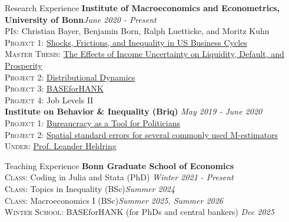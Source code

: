 \documentclass{resume}[10pt] %
\begin{document}
\begin{rSection}{Research Experience}
{\bf Institute of Macroeconomics and Econometrics, University of Bonn}\hfill {\em June 2020 - Present}\\
\textsc{PIs}: Christian Bayer, Benjamin Born, Ralph Luetticke, and Moritz Kuhn\\
\textsc{Project 1}: \href{https://www.ralphluetticke.com/files/BBL_Inequality_Sep2022.pdf}{Shocks, Frictions, and Inequality in US Business Cycles} \\
\textsc{Master Thesis}: \href{https://github.com/LuisCald/Master-Thesis/blob/main/master_thesis.pdf}{The Effects of Income Uncertainty on Liquidity, Default, and Prosperity} \\
\textsc{Project 2}: \href{https://github.com/LuisCald/DistributionalDynamics}{Distributional Dynamics} \\
\textsc{Project 3}: \href{https://github.com/BASEforHANK}{BASEforHANK} \\
\textsc{Project 4}: Job Levels II \\



{\bf Institute on Behavior \& Inequality (Briq)} \hfill {\em May 2019 - June 2020}\\
\textsc{Project 1}: \href{https://drive.google.com/file/d/1sQmazQaMzSg6RY7dHfJwmApYOkhFqtrp/view}{Bureaucracy as a Tool for Politicians}\\
\textsc{Project 2}: \href{https://drive.google.com/file/d/1TzPZ8FT4NvlW-lxk3L13H4BTwC0Jkd4U/view?usp=sharing}{Spatial standard errors for several commonly used M-estimators}\\
\textsc{Under}: \href{http://www.leanderheldring.com/}{Prof. Leander Heldring}
\end{rSection}

\footnotesize
\begin{rSection}{Teaching Experience}
{\bf Bonn Graduate School of Economics}\\
\textsc{Class}: Coding in Julia and Stata (PhD) \hfill {\em Winter 2021 - Present}\\
\textsc{Class}: Topics in Inequality (BSc)\hfill {\em Summer 2024}\\
\textsc{Class}: Macroeconomics I (BSc)\hfill {\em Summer 2025, Summer 2026}\\
\textsc{Winter School}: BASEforHANK (for PhDs and central bankers) \hfill {\em Dec 2025}
\end{rSection}
\end{document}
